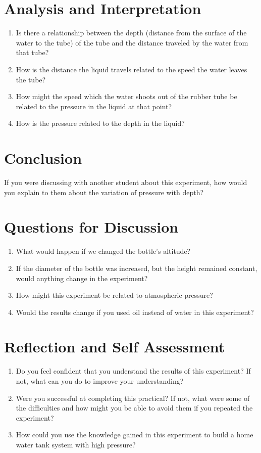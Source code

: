 \section{Analysis and Interpretation}
\begin{enumerate}
\item Is there a relationship between the depth (distance from the surface of the water to the tube) of the tube and the distance traveled by the water from that tube?
\item How is the distance the liquid travels related to the speed the water leaves the tube?
\item How might the speed which the water shoots out of the rubber tube be related to the pressure in the liquid at that point?
\item How is the pressure related to the depth in the liquid?
\end{enumerate}

\section{Conclusion}
If you were discussing with another student about this experiment, how would you explain to them about the variation of pressure with depth?

\section{Questions for Discussion}
\begin{enumerate}
\item What would happen if we changed the bottle’s altitude?
\item If the diameter of the bottle was increased, but the height remained constant, would anything change in the experiment?
\item How might this experiment be related to atmospheric pressure? 
\item Would the results change if you used oil instead of water in this experiment?
\end{enumerate}

\section{Reflection and Self Assessment}
\begin{enumerate}
\item Do you feel confident that you understand the results of this experiment? If not, what can you do to improve your understanding?
\item Were you successful at completing this practical? If not, what were some of the difficulties and how might you be able to avoid them if you repeated the experiment?
\item How could you use the knowledge gained in this experiment to build a home water tank system with high pressure?
\end{enumerate}